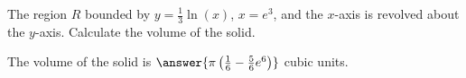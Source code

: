 \documentclass{ximera}
\author{Jim Talamo}
\begin{document}
\begin{exercise}

The region $R$ bounded by $y=\frac{1}{3} \ln(x)$, $x=e^3$, and the $x$-axis is revolved about the $y$-axis.  Calculate the volume of the solid.

The volume of the solid is $\answer{\pi\left(\frac{1}{6}-\frac{5}{6}e^6\right)}$ cubic units.	
\end{exercise}
\end{document}
